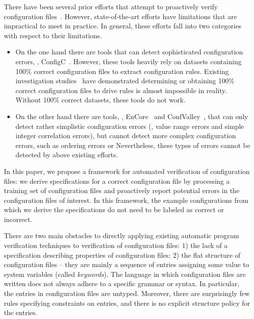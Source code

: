 There have been several prior efforts that attempt to proactively verify 
configuration files~\cite{santolucitoCAV, xu16early,
zhang14encore, huang15confvalley}.
However, state-of-the-art efforts have limitations that are impractical to meet in practice.
In general, these efforts fall into two categories with respect to their limitations.\begin{itemize}
\item On the one hand there are tools that can detect sophisticated 
configuration errors, \eg, ConfigC~\cite{santolucitoCAV}. 
However, these tools heavily rely on datasets containing 100\% 
correct configuration files to extract configuration rules.
Existing investigation studies~\cite{wang04automatic, yin11anempirical}
have demonstrated determining or obtaining 100\% correct configuration
files to drive rules is almost impossible in reality. 
Without 100\% correct datasets, these tools do not work.
\item On the other hand there are tools, 
\eg, EnCore~\cite{zhang14encore} and
ConfValley~\cite{huang15confvalley}, that can only 
detect rather simplistic configuration errors (\eg, value range errors 
and simple integer correlation errors), but cannot detect
more complex configuration errors, such as ordering errors or 
Nevertheless, these types of errors cannot be detected by above existing efforts.
\end{itemize}


In this paper, we propose a framework for automated verification of configuration files: 
we derive specifications for a correct configuration file by processing a training set of configuration files 
and proactively report potential errors in the configuration files of interest.
In this framework, the example configurations from which we derive the specifications do not need to be labeled as correct or incorrect.

There are two main obstacles to directly applying existing automatic program
verification techniques to verification of configuration files:
1) the lack of a specification describing properties of configuration files;
2) the flat structure of configuration files -- they
are mainly a sequence of entries assigning some value to system
variables (called {\emph {keywords}}). 
The language in which configuration files are written does 
not always adhere to a specific grammar or syntax. In particular, the
entries in configuration files are untyped. 
Moreover, there are surprisingly few rules specifying constraints on entries, 
and there is no explicit structure policy for the entries.

